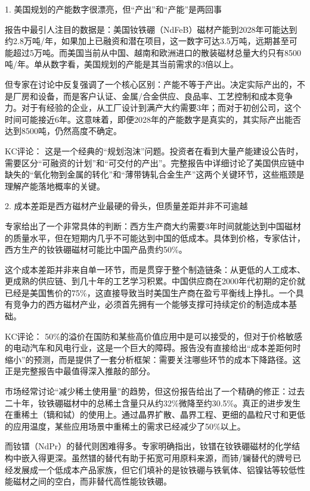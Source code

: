 \documentclass[11pt]{ctexart}
\begin{document}
1. 美国规划的产能数字很漂亮，但“产出”和“产能”是两回事

报告中最引人注目的数据是：美国钕铁硼（NdFeB）磁材产能到2028年可能达到约2.8万吨/年，如果加上已融资和潜在项目，这一数字可达3.5万吨，远期甚至可能超过5万吨。而美国当前从中国、越南和欧洲进口的散装磁材总量大约只有8500吨/年。单从数字看，美国规划的产能是其当前需求的3倍以上。

但专家在讨论中反复强调了一个核心区别：产能不等于产出。决定实际产出的，不是厂房和设备，而是客户认证、金属/合金供应、良品率、工艺控制和成本竞争力。对于有经验的企业，从工厂设计到满产大约需要3年；而对于初创公司，这个时间可能接近6年。这意味着，即便2028年的产能数字是真实的，其实际产出能否达到8500吨，仍然高度不确定。

KC评论： 这是一个经典的“规划泡沫”问题。投资者在看到大量产能建设公告时，需要区分“可融资的计划”和“可交付的产出”。完整报告中详细讨论了美国供应链中缺失的“氧化物到金属的转化”和“薄带铸轧合金生产”这两个关键环节，这些瓶颈是理解产能落地概率的关键。

2. 成本差距是西方磁材产业最硬的骨头，但质量差距并非不可逾越

专家给出了一个非常具体的判断：西方生产商大约需要3年时间就能达到中国磁材的质量水平，但在短期内几乎不可能达到中国的低成本。具体到价格，专家估计，西方生产的钕铁硼磁材可能比中国产品贵约50\%。

这个成本差距并非来自单一环节，而是贯穿于整个制造链条：从更低的人工成本、更成熟的供应链、到几十年的工艺学习积累。中国供应商在2000年代初期的定价就已经是美国售价的75\%，这直接导致当时美国生产商在盈亏平衡线上挣扎。一个具有竞争力的西方磁材产业，必须首先拥有一个能够支撑可持续定价的制造成本基础。

KC评论： 50\%的溢价在国防和某些高价值应用中是可以接受的，但对于价格敏感的电动汽车和风电行业，这是一个巨大的障碍。报告没有直接给出“成本差距何时缩小”的预测，而是提供了一套分析框架：需要关注哪些环节的成本下降路径。这正是完整报告中最值得深入推敲的部分。

市场经常讨论“减少稀土使用量”的趋势，但这份报告给出了一个精确的修正：过去二十年，钕铁硼磁材中的总稀土含量只从约32\%微降至约30.5\%。真正的进步发生在重稀土（镝和铽）的使用上。通过晶界扩散、晶界工程、更细的晶粒尺寸和更低的应用温度，某些应用场景中重稀土的需求已经减少了50\%以上。

而钕镨（NdPr）的替代则困难得多。专家明确指出，钕镨在钕铁硼磁材的化学结构中嵌入得更深。虽然镨的替代有助于拓宽可用原料来源，而铈/镧替代的牌号已经发展成一个低成本产品家族，但它们填补的是钕铁硼与铁氧体、铝镍钴等较低性能磁材之间的空白，而非替代高性能钕铁硼。
\end{document}
